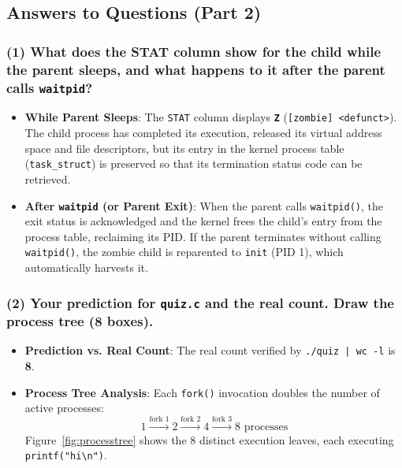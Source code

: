 \documentclass[12pt,a4paper]{article}
\begin{document}
\subsection{Answers to Questions (Part 2)}

\subsubsection*{(1) What does the STAT column show for the child while the parent sleeps, and what happens to it after the parent calls \texttt{waitpid}?}
\begin{itemize}
    \item \textbf{While Parent Sleeps}: The \texttt{STAT} column displays \textbf{\texttt{Z}} (\texttt{[zombie] <defunct>}). The child process has completed its execution, released its virtual address space and file descriptors, but its entry in the kernel process table (\texttt{task\_struct}) is preserved so that its termination status code can be retrieved.
    \item \textbf{After \texttt{waitpid} (or Parent Exit)}: When the parent calls \texttt{waitpid()}, the exit status is acknowledged and the kernel frees the child's entry from the process table, reclaiming its PID. If the parent terminates without calling \texttt{waitpid()}, the zombie child is reparented to \texttt{init} (PID 1), which automatically harvests it.
\end{itemize}

\subsubsection*{(2) Your prediction for \texttt{quiz.c} and the real count. Draw the process tree (8 boxes).}
\begin{itemize}
    \item \textbf{Prediction vs. Real Count}: The real count verified by \texttt{./quiz | wc -l} is \textbf{8}.
    \item \textbf{Process Tree Analysis}: Each \texttt{fork()} invocation doubles the number of active processes:
    \begin{equation*}
        1 \xrightarrow{\text{fork 1}} 2 \xrightarrow{\text{fork 2}} 4 \xrightarrow{\text{fork 3}} 8 \text{ processes}
    \end{equation*}
    Figure~\ref{fig:processtree} shows the 8 distinct execution leaves, each executing \texttt{printf("hi\textbackslash n")}.
\end{itemize}
\end{document}

